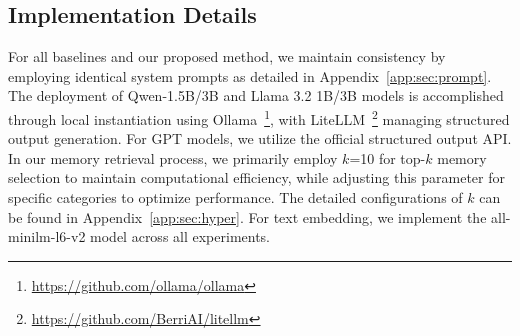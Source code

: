 \documentclass{article}
\begin{document}
\subsection{Implementation Details}
For all baselines and our proposed method, we maintain consistency by employing identical system prompts as detailed in Appendix~\ref{app:sec:prompt}. The deployment of Qwen-1.5B/3B and Llama 3.2 1B/3B models is accomplished through local instantiation using Ollama~\footnote{\url{https://github.com/ollama/ollama}}, with LiteLLM~\footnote{\url{https://github.com/BerriAI/litellm}} managing structured output generation. For GPT models, we utilize the official structured output API. In our memory retrieval process, we primarily employ $k$=10 for top-$k$ memory selection to maintain computational efficiency, while adjusting this parameter for specific categories to optimize performance. The detailed configurations of $k$ can be found in Appendix~\ref{app:sec:hyper}. For text embedding, we implement the all-minilm-l6-v2 model across all experiments.




\end{document}
